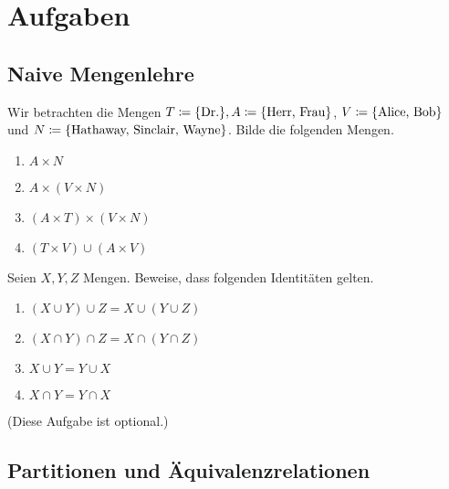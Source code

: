 \section{Aufgaben}


\subsection{Naive Mengenlehre}


\begin{aufg}

  Wir betrachten die Mengen $T \coloneqq \{ \text{Dr.} \}, A \coloneqq \{ \text{Herr, Frau} \}$, $V
  \coloneqq \{ \text{Alice, Bob} \}$ und $N \coloneqq \{ \text{Hathaway, Sinclair, Wayne}
  \}$. Bilde die folgenden Mengen.
  \begin{enumerate}
    \item $A \times N$
    \item $A \times (V \times N)$
    \item $(A\times T) \times (V\times N)$
    \item $(T \times V) \cup (A \times V)$
  \end{enumerate}
  
\end{aufg}


\begin{aufg}

  Seien $X,Y,Z$ Mengen. Beweise, dass folgenden Identitäten gelten.
  \begin{enumerate}
    \item $(X\cup Y) \cup Z = X\cup (Y\cup Z)$
    \item $(X\cap Y) \cap Z = X\cap (Y\cap Z)$
    \item $X \cup Y = Y \cup X$
    \item $X \cap Y = Y \cap X$
  \end{enumerate}
  (Diese Aufgabe ist optional.)
  
\end{aufg}


\subsection{Partitionen und Äquivalenzrelationen}


